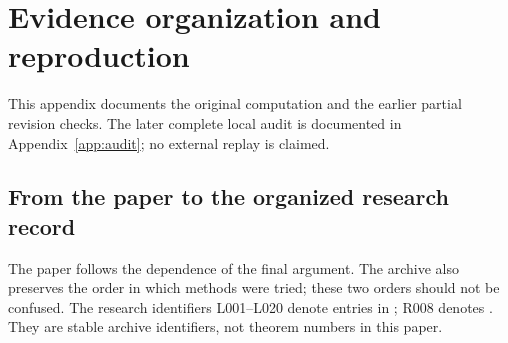 \section{Evidence organization and reproduction}\label{app:reproduction}
This appendix documents the original computation and the earlier partial
revision checks. The later complete local audit is documented in
Appendix~\ref{app:audit}; no external replay is claimed.

\subsection{From the paper to the organized research record}
The paper follows the dependence of the final argument. The archive also
preserves the order in which methods were tried; these two orders should
not be confused. The research identifiers L001--L020 denote entries in
; R008 denotes
. They are stable archive
identifiers, not theorem numbers in this paper.

